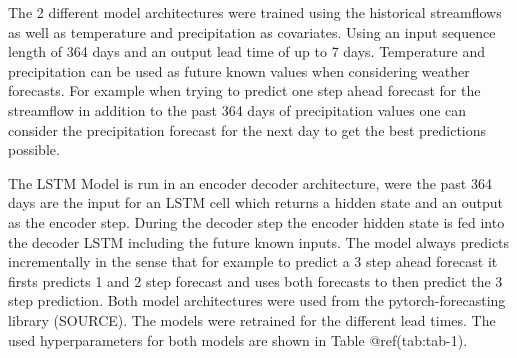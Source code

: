 \documentclass[
]{article}
\begin{document}
The 2 different model architectures were trained using the historical
streamflows as well as temperature and precipitation as covariates.
Using an input sequence length of 364 days and an output lead time of up
to 7 days. Temperature and precipitation can be used as future known
values when considering weather forecasts. For example when trying to
predict one step ahead forecast for the streamflow in addition to the
past 364 days of precipitation values one can consider the precipitation
forecast for the next day to get the best predictions possible.

The LSTM Model is run in an encoder decoder architecture, were the past
364 days are the input for an LSTM cell which returns a hidden state and
an output as the encoder step. During the decoder step the encoder
hidden state is fed into the decoder LSTM including the future known
inputs. The model always predicts incrementally in the sense that for
example to predict a 3 step ahead forecast it firsts predicts 1 and 2
step forecast and uses both forecasts to then predict the 3 step
prediction. Both model architectures were used from the
pytorch-forecasting library (SOURCE). The models were retrained for the
different lead times. The used hyperparameters for both models are shown
in Table @ref(tab:tab-1).
\end{document}
